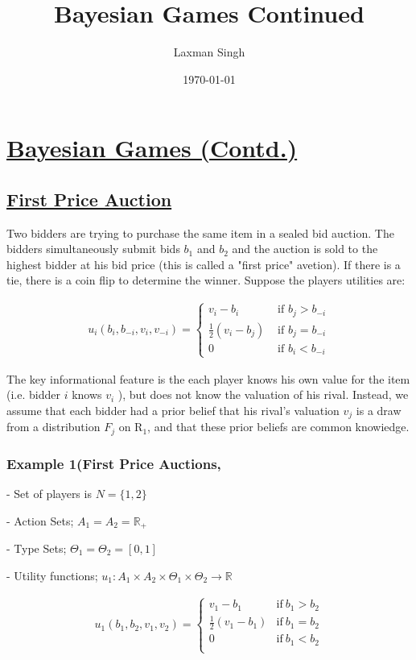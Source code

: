 \documentclass[12pt,a4paper]{article}
\author{Laxman Singh}
\date{\today}
\title{Bayesian Games Continued}
\begin{document}
 \section*{\underline{Bayesian Games (Contd.)}}
   \subsection*{  \underline{ First Price Auction } } 

 Two bidders are trying to purchase the same item in a sealed bid auction. The bidders simultaneously submit bids \(b_1\) and \(b_2\) and the auction is sold to the highest bidder at his bid price (this is called a "first price" avetion). If there is a tie, there is a coin flip to determine the winner. Suppose the players utilities are:
 
 \begin{align*}
 u_i\left(b_i, b_{-i}, v_i, v_{-i}\right)= \begin{cases}v_i-b_i & \text { if } b_j>b_{-i} \\ \frac{1}{2}\left(v_i-b_j\right) & \text { if } b_j=b_{-i} \\ 0 & \text { if } b_i<b_{-i}\end{cases}
 \end{align*}
 
 
 The key informational feature is the each player knows his own value for the item (i.e. bidder \(i\) knows \(v_i\) ), but does not know the valuation of his rival. Instead, we assume that each bidder had a prior belief that his rival's valuation \(v_j\) is a draw from a distribution \(F_j\) on \(\mathrm{R}_1\), and that these prior beliefs are common knowiedge.
 
  \subsubsection*{ Example 1(First Price Auctions, } 
  - Set of players is \(N=\{1,2\}\)
  
  - Action Sets; \(A_{1}=A_{2}=\mathbb{R}_{+}\)
  
  - Type Sets; \(\Theta_{1}=\Theta_{2}=[0,1]\)
  
  - Utility functions; \(u_{1}:A_{1} \times A_{2} \times \Theta_{1} \times \Theta_{2} \to \mathbb{R}\) 
  
   \begin{align*}
      u_{1}(b_{1},b_{2},v_{1},v_{2})=
      \begin{cases}
        v_{1}-b_{1} & \text{if} \ b_{1}>b_{2} \\
        \frac{1}{2}(v_{1}-b_{1}) & \text{if} \ b_{1}=b_{2}\\
        0 & \text{if} \ b_{1}<b_{2}\\
      \end{cases}
  \end{align*}
\end{document}
